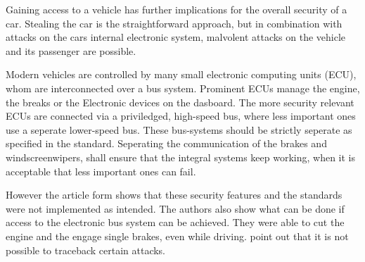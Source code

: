 	Gaining access to a vehicle has further implications for the overall security of a car.
	Stealing the car is the straightforward approach,
	but in combination with attacks on the cars internal electronic system,
	malvolent attacks on the vehicle and its passenger are possible.

	Modern vehicles are controlled by many small electronic computing units (ECU),
	whom are interconnected over a bus system.
	Prominent ECUs manage the engine, the breaks or the Electronic devices on the dasboard.
	The more security relevant ECUs are connected via a priviledged,
	high-speed bus,
	where less important ones use a seperate lower-speed bus.
	These bus-systems should be strictly seperate as specified in the standard. %
	Seperating the communication of the brakes and windscreenwipers,
	shall ensure that the integral systems keep working,
	when it is acceptable that less important ones can fail.

	However the article form \citeauthor{expModernAuto}
	shows that these security features and the standards were not implemented as intended.
	The authors also show what can be done if access to the electronic bus system can be achieved.
	They were able to cut the engine and the engage single brakes,
	even while driving.
	\citeauthor{expModernAuto} point out that it is not possible to traceback certain attacks.	%

